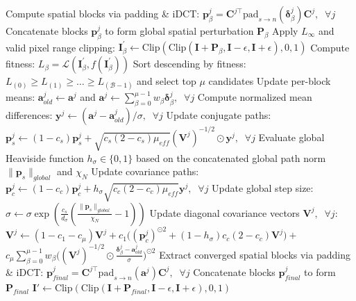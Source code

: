 \begin{algorithm}[h]
\begin{algorithmic}[1]
        \State Compute spatial blocks via padding \& iDCT: $\mathbf{p}_\beta^j = \bm{C}^{j\top} \text{pad}_{s \to n}(\bm{\delta}_\beta^j) \bm{C}^j, \;\; \forall j$
        \State Concatenate blocks $\mathbf{p}_\beta^j$ to form global spatial perturbation $\mathbf{P}_\beta$
        \State Apply $L_\infty$ and valid pixel range clipping: \State\hspace{1em}$\bm{I}_\beta^{\prime} \leftarrow \text{Clip}(\text{Clip}(\bm{I} + \mathbf{P}_\beta, \bm{I} - \epsilon, \bm{I} + \epsilon), 0, 1)$
        \State Compute fitness: $L_\beta = \mathcal{L}(\bm{I}_\beta^{\prime}, f(\bm{I}_\beta^{\prime}))$
    \EndFor
    \vspace{0.05cm}
    \State Sort descending by fitness: $L_{(0)} \ge L_{(1)} \ge \dots \ge L_{(\mathcal{B}-1)}$ and select top $\mu$ 
    \Statex\hspace{2em}candidates
    \State Update per-block means: $\bm{a}_{old}^j \leftarrow \bm{a}^j$ and $\bm{a}^j \leftarrow \sum_{\beta=0}^{\mu-1} w_\beta \bm{\delta}_{\beta}^j, \;\; \forall j$
    \vspace{0.05cm}
    \State Compute normalized mean differences: $\bm{y}^j \leftarrow (\bm{a}^j - \bm{a}_{old}^j) / \sigma, \;\; \forall j$
    \State Update conjugate paths: $\bm{p}_s^j \leftarrow (1-c_s)\bm{p}_s^j + \sqrt{c_s(2-c_s)\mu_{eff}} (\bm{V}^j)^{-1/2} \odot \bm{y}^j, \;\; \forall j$
    \State Evaluate global Heaviside function $h_\sigma \in \{0, 1\}$ based on the concatenated global 
    \Statex\hspace{2em}path norm $\|\bm{p}_s\|_{global}$ and $\chi_N$
    \State Update covariance paths: $\bm{p}_c^j \leftarrow (1-c_c)\bm{p}_c^j + h_\sigma \sqrt{c_c(2-c_c)\mu_{eff}} \bm{y}^j, \;\; \forall j$
    \State Update global step size: $\sigma \leftarrow \sigma \exp \left( \frac{c_s}{d_\sigma} \left( \frac{\|\bm{p}_s\|_{global}}{\chi_N} - 1 \right) \right)$
    \vspace{0.05cm}
    \State Update diagonal covariance vectors $\bm{V}^j, \;\; \forall j$:
    \State \quad $\bm{V}^j \leftarrow (1 - c_1 - c_\mu)\bm{V}^j + c_1 \big((\bm{p}_c^j)^{\odot 2} + (1-h_\sigma)c_c(2-c_c)\bm{V}^j\big) +$ \Statex\hspace{3em}$c_\mu \sum_{\beta=0}^{\mu-1} w_\beta \big( (\bm{V}^j)^{-1/2} \odot \frac{\bm{\delta}_{\beta}^j - \bm{a}_{old}^j}{\sigma} \big)^{\odot 2}$
\EndFor
\vspace{0.05cm}
\State Extract converged spatial blocks via padding \& iDCT: $\mathbf{p}_{final}^j = \bm{C}^{j\top} \text{pad}_{s \to n}(\bm{a}^j) \bm{C}^j, \;\; \forall j$
\State Concatenate blocks $\mathbf{p}_{final}^j$ to form $\mathbf{P}_{final}$
\State \Return $\bm{I}' \leftarrow \text{Clip}(\text{Clip}(\bm{I} + \mathbf{P}_{final}, \bm{I} - \epsilon, \bm{I} + \epsilon), 0, 1)$
\end{algorithmic}
\end{algorithm}

